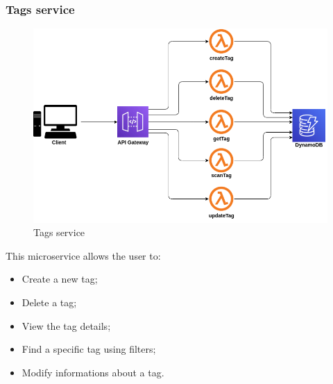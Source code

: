 \subsubsection{Tags service}
\begin{figure}[!h]
    \vspace{5px}
    \includegraphics[scale=0.5]{../../../../Images/Diagrammi/maintainerManual/tagsService.png}
    \centering
    \caption{Tags service}
\end{figure}
This microservice allows the user to:
\begin{itemize}
    \item Create a new tag;
    \item Delete a tag;
    \item View the tag details;
    \item Find a specific tag using filters;
    \item Modify informations about a tag.
\end{itemize}
\pagebreak
